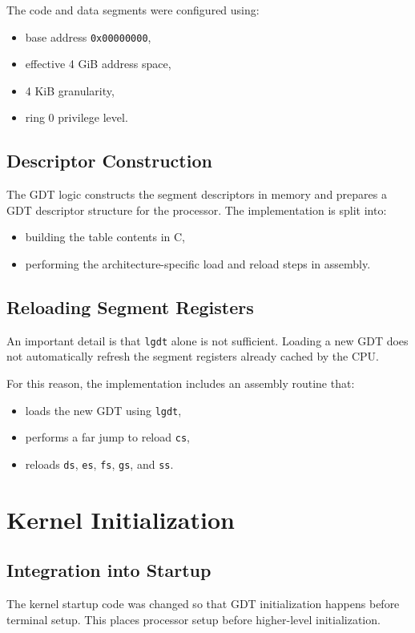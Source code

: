The code and data segments were configured using:
\begin{itemize}
  \item base address \texttt{0x00000000},
  \item effective 4 GiB address space,
  \item 4 KiB granularity,
  \item ring 0 privilege level.
\end{itemize}

\subsection{Descriptor Construction}
The GDT logic constructs the segment descriptors in memory and prepares a GDT descriptor structure for the processor. The implementation is split into:
\begin{itemize}
  \item building the table contents in C,
  \item performing the architecture-specific load and reload steps in assembly.
\end{itemize}

\subsection{Reloading Segment Registers}
An important detail is that \texttt{lgdt} alone is not sufficient. Loading a new GDT does not automatically refresh the segment registers already cached by the CPU.

For this reason, the implementation includes an assembly routine that:
\begin{itemize}
  \item loads the new GDT using \texttt{lgdt},
  \item performs a far jump to reload \texttt{cs},
  \item reloads \texttt{ds}, \texttt{es}, \texttt{fs}, \texttt{gs}, and \texttt{ss}.
\end{itemize}

\section{Kernel Initialization}

\subsection{Integration into Startup}
The kernel startup code was changed so that GDT initialization happens before terminal setup. This places processor setup before higher-level initialization.

